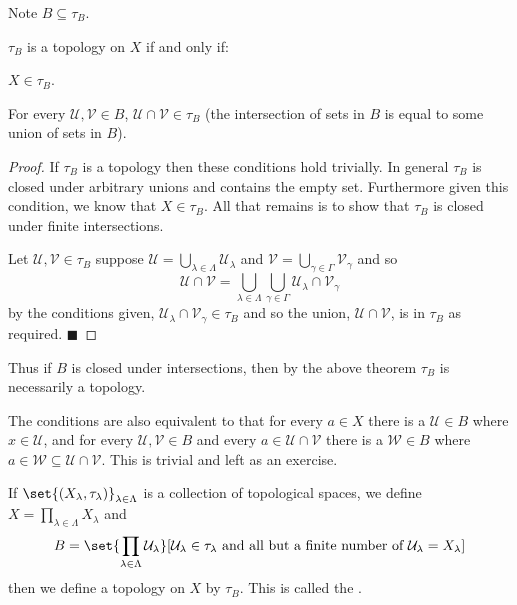 \documentclass[10pt]{article}
\def\qed{\hskip1cm\penalty-100\hbox{}\hfill$\blacksquare$}
\def\mU{\mathcal{U}}
\def\mV{\mathcal{V}}
\def\mW{\mathcal{W}}
\begin{document}
Note $B\subseteq\tau_B$.

\begin{thrm*}

    $\tau_B$ is a topology on $X$ if and only if:
    \benum
        \item $X\in\tau_B$.
        \item For every $\mU,\mV\in B$, $\mU\cap\mV\in\tau_B$ (the intersection of sets in $B$ is equal to some union of sets in $B$).
    \eenum

\end{thrm*}

\begin{proof}

    If $\tau_B$ is a topology then these conditions hold trivially.
    In general $\tau_B$ is closed under arbitrary unions and contains the empty set.
    Furthermore given this condition, we know that $X\in\tau_B$.
    All that remains is to show that $\tau_B$ is closed under finite intersections.

    Let $\mU,\mV\in\tau_B$ suppose $\mU=\bigcup_{\lambda\in\Lambda}\mU_\lambda$ and $\mV=\bigcup_{\gamma\in\Gamma}\mV_\gamma$ and so
    \[ \mU\cap\mV = \bigcup_{\lambda\in\Lambda}\bigcup_{\gamma\in\Gamma}\mU_\lambda\cap\mV_\gamma \]
    by the conditions given, $\mU_\lambda\cap\mV_\gamma\in\tau_B$ and so the union, $\mU\cap\mV$, is in $\tau_B$ as required.
    \qed

\end{proof}

Thus if $B$ is closed under intersections, then by the above theorem $\tau_B$ is necessarily a topology.

The conditions are also equivalent to that for every $a\in X$ there is a $\mU\in B$ where $x\in\mU$, and for every $\mU,\mV\in B$ and every $a\in\mU\cap\mV$ there is a $\mW\in B$ where
$a\in\mW\subseteq\mU\cap\mV$.
This is trivial and left as an exercise.

\begin{defn*}

    If $\set{(X_\lambda,\tau_\lambda)}_{\lambda\in\Lambda}$ is a collection of topological spaces, we define $X=\prod_{\lambda\in\Lambda}X_\lambda$ and
    \[ B = \set{\prod_{\lambda\in\Lambda}\mU_\lambda}[\mU_\lambda\in\tau_\lambda\text{ and all but a finite number of }\mU_\lambda=X_\lambda] \]
    then we define a topology on $X$ by $\tau_B$.
    This is called the .

\end{defn*}
\end{document}
